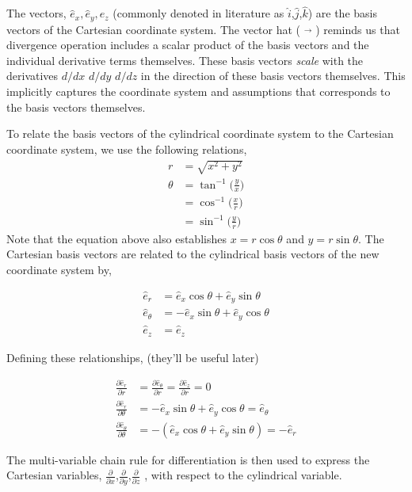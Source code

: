 \documentclass[12pt]{article}
\begin{document}
The vectors, $\hat{e}_x,\hat{e}_y,\hat{e}_z$ (commonly denoted in literature as $\hat{i}$,$\hat{j}$,$\hat{k}$) are the basis vectors of the Cartesian coordinate system. The vector hat ( $\vec{}$ ) reminds us that divergence operation includes a scalar product of  the basis vectors and the individual derivative terms themselves.
These basis vectors \textit{scale} with the derivatives $d/dx$ $d/dy$ $d/dz$ in the direction of these basis vectors themselves. This implicitly captures the coordinate system and assumptions that corresponds to the basis vectors themselves.

To relate the basis vectors of the cylindrical coordinate system to the Cartesian coordinate system, we use the following relations,
\begin{align*}
	r 
	&= \sqrt{x^2 + y^2} \\
	\theta 
	&= \tan^{-1} \Big( \frac{y}{x} \Big) \\
	&= \cos^{-1} \Big( \frac{x}{r} \Big) \\
	&=\sin^{-1} \Big( \frac{y}{r} \Big)		
\end{align*}
	Note that the equation above also establishes $x   = r\cos \theta$ and $y = r\sin\theta$. The Cartesian basis vectors are related to the cylindrical basis vectors of the new coordinate system by,

\begin{align*}
	\hat{e}_r 
	&= \hat{e}_x \cos \theta + \hat{e}_y \sin \theta \\
	\hat{e}_{\theta} 
	&= -\hat{e}_x \sin \theta + \hat{e}_y \cos \theta \\
	\hat{e}_z 	 
	&= \hat{e}_z %
\end{align*}

Defining these relationships, (they'll be useful later)

\begin{align*}
	\frac{\partial \hat{e}_{r	  }}{\partial r} 
	&= \frac{\partial \hat{e}_{\theta}}{\partial r} 
	= \frac{\partial \hat{e}_{z}	   }{\partial r} = 0 \\
	\frac{\partial \hat{e}_{r	  }}{\partial \theta} 
	&=	-\hat{e}_x \sin \theta + \hat{e}_y \cos \theta                = \hat{e}_{\theta}\\
	\frac{\partial \hat{e}_{\theta	  }}{\partial \theta}
	&= -\left(
	\hat{e}_x \cos \theta + \hat{e}_y \sin \theta
	\right) = 
	-\hat{e}_{r}
\end{align*}

The multi-variable chain rule for differentiation is then used to express the Cartesian variables, $\frac{\partial}{\partial x}$,$\frac{\partial}{\partial y}$,$\frac{\partial}{\partial z}$ , with respect to the cylindrical variable.
\end{document}
